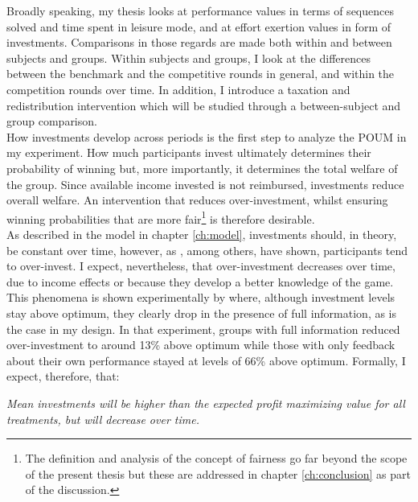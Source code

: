     Broadly speaking, my thesis looks at performance values in terms of sequences solved and time spent in leisure mode, and at effort exertion values in form of investments. Comparisons in those regards are made both within and between subjects and groups. Within subjects and groups, I look at the differences between the benchmark and the competitive rounds in general, and within the competition rounds over time. In addition, I introduce a taxation and redistribution intervention which will be studied through a between-subject and group comparison.\\
    
    How investments develop across periods is the first step to analyze the POUM in my experiment. How much participants invest ultimately determines their probability of winning but, more importantly, it determines the total welfare of the group. Since available income invested is not reimbursed, investments reduce overall welfare. An intervention that reduces over-investment, whilst ensuring winning probabilities that are more fair\footnote{The definition and analysis of the concept of fairness go far beyond the scope of the present thesis but these are addressed in chapter \ref{ch:conclusion} as part of the discussion.} is therefore desirable.\\
    
    As described in the model in chapter \ref{ch:model}, investments should, in theory, be constant over time, however, as \cite{sheremeta2016}, among others, have shown, participants tend to over-invest. I expect, nevertheless, that over-investment decreases over time, due to income effects or because they develop a better knowledge of the game. This phenomena is shown experimentally by \cite{fallucchi2013} where, although investment levels stay above optimum, they clearly drop in the presence of full information, as is the case in my design. In that experiment, groups with full information reduced over-investment to around 13\% above optimum while those with only feedback about their own performance stayed at levels of 66\% above optimum. Formally, I expect, therefore, that:
    
     \begin{hyp} \label{hyp:treat}\textit{Mean investments will be higher than the expected profit maximizing value for all treatments, but will decrease over time.}\end{hyp}
     
